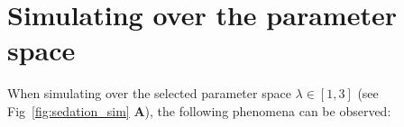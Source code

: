 %
%
%
%
%


\section{Simulating over the parameter space}\label{sec:simulating-over-the-parameter-space}

When simulating over the selected parameter space $ \lambda \in \left[ 1, 3 \right] $ (see Fig~\ref{fig:sedation_sim}
\textbf{A}),
the following phenomena can be observed:

